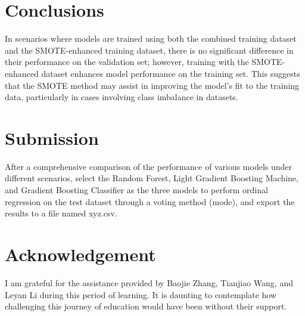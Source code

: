 \section{Conclusions} 

In scenarios where models are trained using both the combined training dataset and the SMOTE-enhanced training dataset, there is no significant difference in their performance on the validation set; however, training with the SMOTE-enhanced dataset enhances model performance on the training set. This suggests that the SMOTE method may assist in improving the model's fit to the training data, particularly in cases involving class imbalance in datasets.

\section{Submission}

After a comprehensive comparison of the performance of various models under different scenarios, select the Random Forest, Light Gradient Boosting Machine, and Gradient Boosting Classifier as the three models to perform ordinal regression on the test dataset through a voting method (mode), and export the results to a file named xyz.csv.

\section*{Acknowledgement}
I am grateful for the assistance provided by Baojie Zhang, Tianjiao Wang, and Leyan Li during this period of learning. It is daunting to contemplate how challenging this journey of education would have been without their support.


